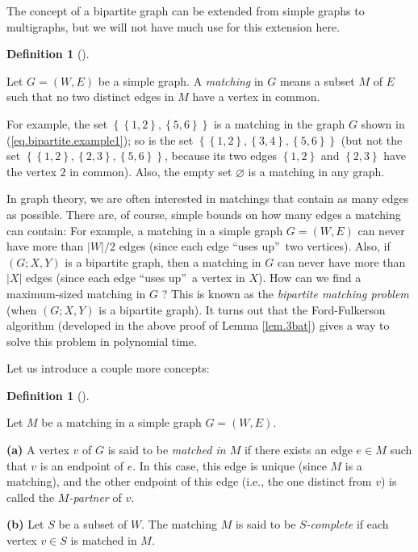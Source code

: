 \documentclass[numbers=enddot,12pt,final,onecolumn,notitlepage]{scrartcl}%
\theoremstyle{definition}
\newtheorem{defi}[theo]{Definition}
\newenvironment{definition}[1][]
{\begin{defi}[#1]\begin{leftbar}}
{\end{leftbar}\end{defi}}
\begin{document}
The concept of a bipartite graph can be extended from simple graphs to
multigraphs, but we will not have much use for this extension here.

\begin{definition}
Let $G=\left(  W,E\right)  $ be a simple graph. A \textit{matching} in $G$
means a subset $M$ of $E$ such that no two distinct edges in $M$ have a vertex
in common.
\end{definition}

For example, the set $\left\{  \left\{  1,2\right\}  ,\left\{  5,6\right\}
\right\}  $ is a matching in the graph $G$ shown in
(\ref{eq.bipartite.example1}); so is the set $\left\{  \left\{  1,2\right\}
,\left\{  3,4\right\}  ,\left\{  5,6\right\}  \right\}  $ (but not the set
$\left\{  \left\{  1,2\right\}  ,\left\{  2,3\right\}  ,\left\{  5,6\right\}
\right\}  $, because its two edges $\left\{  1,2\right\}  $ and $\left\{
2,3\right\}  $ have the vertex $2$ in common). Also, the empty set
$\varnothing$ is a matching in any graph.

In graph theory, we are often interested in matchings that contain as many
edges as possible. There are, of course, simple bounds on how many edges a
matching can contain: For example, a matching in a simple graph $G=\left(
W,E\right)  $ can never have more than $\left\vert W\right\vert /2$ edges
(since each edge \textquotedblleft uses up\textquotedblright\ two vertices).
Also, if $\left(  G;X,Y\right)  $ is a bipartite graph, then a matching in $G$
can never have more than $\left\vert X\right\vert $ edges (since each edge
\textquotedblleft uses up\textquotedblright\ a vertex in $X$). How can we find
a maximum-sized matching in $G$ ? This is known as the \textit{bipartite
matching problem} (when $\left(  G;X,Y\right)  $ is a bipartite graph). It
turns out that the Ford-Fulkerson algorithm (developed in the above proof of
Lemma \ref{lem.3bat}) gives a way to solve this problem in polynomial time.

Let us introduce a couple more concepts:

\begin{definition}
Let $M$ be a matching in a simple graph $G=\left(  W,E\right)  $.

\textbf{(a)} A vertex $v$ of $G$ is said to be \textit{matched in $M$} if
there exists an edge $e\in M$ such that $v$ is an endpoint of $e$. In this
case, this edge is unique (since $M$ is a matching), and the other endpoint of
this edge (i.e., the one distinct from $v$) is called the \textit{$M$-partner}
of $v$.

\textbf{(b)} Let $S$ be a subset of $W$. The matching $M$ is said to be
\textit{$S$-complete} if each vertex $v\in S$ is matched in $M$.
\end{definition}
\end{document}
